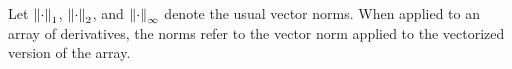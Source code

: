 Let $\left\Vert \cdot\right\Vert_1$, $\left\Vert \cdot\right\Vert_2$, and $\left\Vert \cdot\right\Vert_\infty$ denote the
usual vector norms.  When applied to an array of derivatives, the norms refer to
the vector norm applied to the vectorized version of the array.



